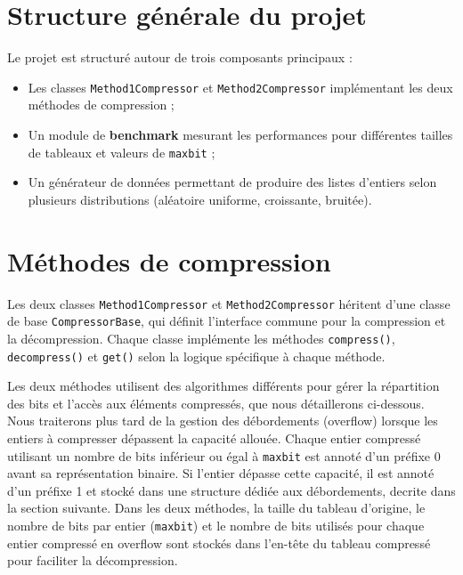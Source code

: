 \documentclass{rapportClass} %
\begin{document}
\section{Structure générale du projet}
Le projet est structuré autour de trois composants principaux :
\begin{itemize}
    \item Les classes \texttt{Method1Compressor} et \texttt{Method2Compressor} implémentant les deux méthodes de compression ;
    \item Un module de \textbf{benchmark} mesurant les performances pour différentes tailles de tableaux et valeurs de \texttt{maxbit} ;
    \item Un générateur de données permettant de produire des listes d'entiers selon plusieurs distributions (aléatoire uniforme, croissante, bruitée).
\end{itemize}

\section{Méthodes de compression}
Les deux classes \texttt{Method1Compressor} et \texttt{Method2Compressor} héritent d'une classe de base \texttt{CompressorBase},
qui définit l'interface commune pour la compression et la décompression.
Chaque classe implémente les méthodes \texttt{compress()}, \texttt{decompress()} et \texttt{get()} selon la logique spécifique à chaque méthode.

Les deux méthodes utilisent des algorithmes différents pour gérer la répartition des bits et l'accès aux éléments compressés, que nous détaillerons ci-dessous.
Nous traiterons plus tard de la gestion des débordements (overflow) lorsque les entiers à compresser dépassent la capacité allouée.
Chaque entier compressé utilisant un nombre de bits inférieur ou égal à \texttt{maxbit} est annoté d'un préfixe 0 avant sa représentation binaire.
Si l'entier dépasse cette capacité, il est annoté d'un préfixe 1 et stocké dans une structure dédiée aux débordements, decrite dans la section suivante.
Dans les deux méthodes, la taille du tableau d'origine, le nombre de bits par entier (\texttt{maxbit}) et le nombre de bits utilisés pour chaque entier compressé en overflow sont stockés dans l'en-tête du tableau compressé pour faciliter la décompression.
\end{document}
